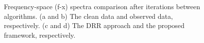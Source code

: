 {{\begin{figure}[htb!]
{				\label{fx_Proposed_curved}}		
			\caption{Frequency-space (f-x) spectra comparison after  iterations between  algorithms. (a and b) The clean data and observed data, respectively. (c and d) The DRR approach and the proposed framework, respectively.}
			\label{fx_clean_curved,fx_Observed_curved,fx_DRR_curved,fx_Proposed_curved}
	\end{figure}}
}%


